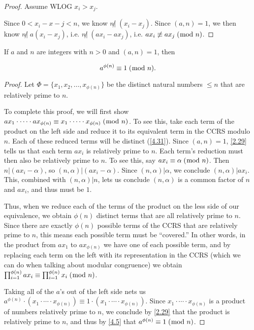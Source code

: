 \documentclass[../main.tex]{subfiles}
\begin{document}
\begin{proof}
  Assume WLOG $x_i > x_j$.

  Since $0 < x_i - x-j < n$, we know $n \not | \; (x_i - x_j)$. Since $(a, n) = 1$, we then know $n \not | \; a(x_i - x_j)$, i.e. $n \not | \; (ax_i - ax_j)$, i.e. $ax_i \not \equiv ax_j \; (\bmod \; n)$.
\end{proof}



\begin{thm} \label{4.32}
  If $a$ and $n$ are integers with $n > 0$ and $(a, n) = 1$, then

  $$a^{\phi (n)} \equiv 1 \; (\bmod \; n) .$$
\end{thm}

\begin{proof}
  Let $\Phi = \{x_1, x_2, \ldots, x_{\phi (n)} \}$ be the distinct natural numbers $\leq n$ that are relatively prime to $n$.

  To complete this proof, we will first show $ax_1 \cdot \cdots \cdot ax_{\phi (n)} \equiv x_1 \cdot \cdots \cdot x_{\phi (n)} \; (\bmod \; n)$. To see this, take each term of the product on the left side and reduce it to its equivalent term in the CCRS modulo $n$. Each of these reduced terms will be distinct (\ref{4.31}). Since $(a, n) = 1$, \ref{2.29} tells us that each term $ax_i$ is relatively prime to $n$. Each term's reduction must then also be relatively prime to $n$.
  To see this, say $ax_i \equiv \alpha \; (\bmod \; n)$. Then $n | (ax_i - \alpha)$, so $(n, \alpha) | (ax_i - \alpha)$. Since $(n, \alpha) | \alpha$, we conclude $(n, \alpha) | ax_i$. This, combined with $(n, \alpha) | n$, lets us conclude $(n, \alpha)$ is a common factor of $n$ and $ax_i$, and thus must be $1$.

  Thus, when we reduce each of the terms of the product on the less side of our equivalence, we obtain $\phi (n)$ distinct terms that are all relatively prime to $n$. Since there are exactly $\phi (n)$ possible terms of the CCRS that are relatively prime to $n$, this means each possible term must be ``covered.'' In other words, in the product from $ax_1$ to $ax_{\phi (n)}$ we have one of each possible term, and by replacing each term on the left with its representation in the CCRS (which we can do when talking about modular congruence) we obtain $\prod_{i=1}^{\phi (n)} ax_i \equiv \prod_{i=1}^{\phi (n)} x_i \; (\bmod \; n)$.

  Taking all of the $a$'s out of the left side nets us $a^{\phi (n)} \cdot (x_1 \cdot \cdots \cdot x_{\phi (n)}) \equiv 1 \cdot (x_1 \cdot \cdots \cdot x_{\phi (n)})$. Since $x_1 \cdot \cdots \cdot x_{\phi (n)}$ is a product of numbers relatively prime to $n$, we conclude by \ref{2.29} that the product is relatively prime to $n$,
  and thus by \ref{4.5} that $a^{\phi (n)} \equiv 1 \; (\bmod \; n)$.
\end{proof}
\end{document}
